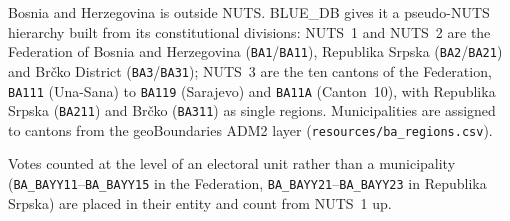 Bosnia and Herzegovina is outside NUTS.  BLUE\_DB gives it a pseudo-NUTS
hierarchy built from its constitutional divisions:
NUTS~1 and NUTS~2 are the Federation of Bosnia and Herzegovina
(\texttt{BA1}/\texttt{BA11}), Republika Srpska (\texttt{BA2}/\texttt{BA21})
and Brčko District (\texttt{BA3}/\texttt{BA31}); NUTS~3 are the ten cantons of
the Federation, \texttt{BA111} (Una-Sana) to \texttt{BA119} (Sarajevo) and
\texttt{BA11A} (Canton~10), with Republika Srpska (\texttt{BA211}) and Brčko
(\texttt{BA311}) as single regions.  Municipalities are assigned to cantons
from the geoBoundaries ADM2 layer (\texttt{resources/ba\_regions.csv}).

Votes counted at the level of an electoral unit rather than a municipality
(\texttt{BA\_BAYY11}--\texttt{BA\_BAYY15} in the Federation,
\texttt{BA\_BAYY21}--\texttt{BA\_BAYY23} in Republika Srpska) are placed in
their entity and count from NUTS~1 up.
